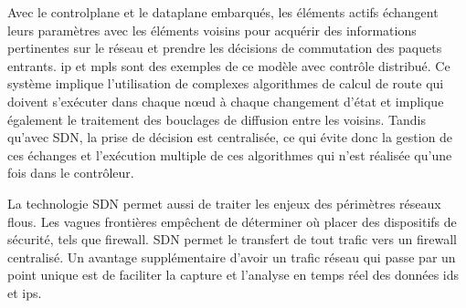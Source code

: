 Avec le \gls{controlplane} et le \gls{dataplane} embarqués, les éléments actifs échangent leurs paramètres avec les éléments voisins pour acquérir des informations pertinentes sur le réseau et prendre les décisions de commutation des paquets entrants. \gls{ip} et \gls{mpls} sont des exemples de ce modèle avec contrôle distribué. 
Ce système implique l'utilisation de complexes algorithmes de calcul de route qui doivent s'exécuter dans chaque nœud à chaque changement d'état et implique également le traitement des bouclages de diffusion entre les voisins. 
Tandis qu'avec SDN, la prise de décision est centralisée, ce qui évite donc la gestion de ces échanges et l'exécution multiple de ces algorithmes qui n'est réalisée qu'une fois dans le contrôleur. 



La technologie SDN permet aussi de traiter les enjeux des périmètres réseaux flous. Les vagues frontières empêchent de déterminer où placer des dispositifs de sécurité, tels que firewall. SDN permet le transfert de tout trafic vers un firewall centralisé. Un avantage supplémentaire d'avoir un trafic réseau qui passe par un point unique est de faciliter la capture et l'analyse en temps réel des données \gls{ids} et \gls{ips}. \cite{sdnbookControlDataPlanes}

